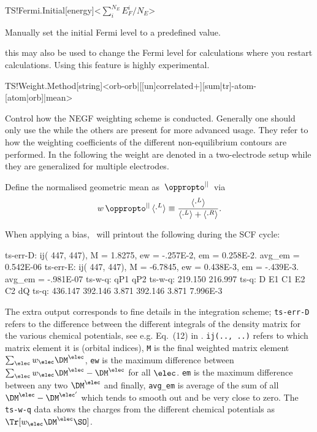 \begin{fdfentry}{TS!Fermi.Initial}[energy]<$\sum^{N_E}_iE_F^i/N_E$>

  Manually set the initial Fermi level to a predefined value. 

  \note this may also be used to change the Fermi level for
  calculations where you restart calculations. Using this feature is
  highly experimental.
  
\end{fdfentry}

\begin{fdfentry}{TS!Weight.Method}[string]<orb-orb|[[un]correlated+][sum|tr]-atom-[atom|orb]|mean>
  
  Control how the NEGF weighting scheme is conducted. Generally one
  should only use the  while the others are present for
  more advanced usage. They refer to how the weighting coefficients of
  the different non-equilibrium contours are performed. In the
  following the weight are denoted in a two-electrode setup while they
  are generalized for multiple electrodes.

  \def\mypropto{\,\oppropto^{||}\,} %
  \def\mn{{\mu\nu}} %
  Define the normalised geometric mean as $\mypropto$ via
  \begin{equation}
    w\mypropto \langle\cdot^L\rangle\equiv
    \frac{\langle\cdot^L\rangle}{\langle\cdot^L\rangle+\langle\cdot^R\rangle}.
  \end{equation}

  When applying a bias, \tsiesta\ will printout the following during
  the SCF cycle:
\begin{output}[fontsize=\footnotesize]
ts-err-D: ij(  447,   447), M =  1.8275, ew = -.257E-2, em = 0.258E-2. avg_em = 0.542E-06
ts-err-E: ij(  447,   447), M = -6.7845, ew = 0.438E-3, em = -.439E-3. avg_em = -.981E-07
ts-w-q:               qP1       qP2
ts-w-q:           219.150   216.997
ts-q:         D        E1        C1        E2        C2        dQ
ts-q:   436.147   392.146     3.871   392.146     3.871  7.996E-3
  \end{output}
  The extra output corresponds to fine details in the integration
  scheme; \texttt{ts-err-D} refers to the difference between the
  different integrals of the density matrix for the various chemical
  potentials, see e.g. Eq.~(12) in \cite{Papior2017}. \texttt{ij(..,
      ..)} refers to which matrix element it is (orbital indices),
  \texttt{M} is the final weighted matrix element
  $\sum_{\elec}w_\elec\DM^\elec$, \texttt{ew} is the maximum difference
  between $\sum_{\elec}w_\elec\DM^\elec-\DM^\elec$ for all
  $\elec$. \texttt{em} is the maximum difference between any two
  $\DM^\elec$ and finally, \texttt{avg\_em} is average of the sum of all
  $\DM^\elec-\DM^{\elec'}$ which tends to smooth out and be very close
  to zero.
  The \texttt{ts-w-q} data shows the charges from the different
  chemical potentials as $\Tr[w_\elec\DM^\elec\SO]$.


\end{fdfentry}
